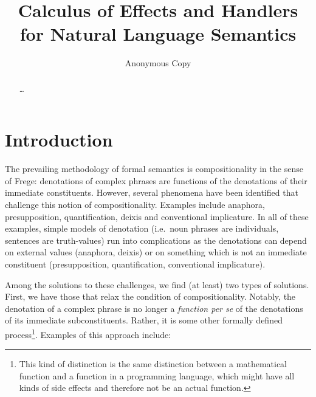 \documentclass{llncs}
\begin{document}
%
\title{Calculus of Effects and Handlers \\ for Natural Language Semantics}
%
\author{Anonymous Copy}
%

\maketitle              %

\begin{abstract}
\dots
{}
\end{abstract}
%

\section{Introduction}
\label{sec:introduction}

The prevailing methodology of formal semantics is compositionality in the
sense of Frege: denotations of complex phrases are functions of the
denotations of their immediate constituents. However, several phenomena
have been identified that challenge this notion of
compositionality. Examples include anaphora, presupposition,
quantification, deixis and conventional implicature. In all of these
examples, simple models of denotation (i.e.\ noun phrases are individuals,
sentences are truth-values) run into complications as the denotations can
depend on external values (anaphora, deixis) or on something which is not
an immediate constituent (presupposition, quantification, conventional
implicature).

Among the solutions to these challenges, we find (at least) two types of
solutions. First, we have those that relax the condition of
compositionality. Notably, the denotation of a complex phrase is no longer
a \emph{function per se} of the denotations of its immediate
subconstituents. Rather, it is some other formally defined
process\footnote{This kind of distinction is the same distinction between a
  mathematical function and a function in a programming language, which
  might have all kinds of side effects and therefore not be an actual
  function.}. Examples of this approach include:
\end{document}
